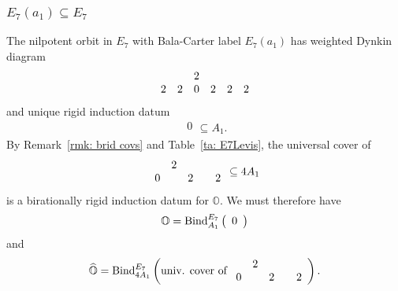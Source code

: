 \documentclass[11pt]{amsart}
\renewcommand{\O}{{\mathbb O}}
\newcommand{\bZ}{{\mathbb Z}}
\newcommand{\BInd}{{{\mbox{\rm Bind}}}}
\newcommand{\hatO}{\widehat{\O}}
\numberwithin{equation}{section}
\begin{document}

	

	\subsubsection{\texorpdfstring{$E_7(a_1)\subseteq E_7$}{E7a1 in E7}}\label{sss: E7a1 in E7}
	
	The nilpotent orbit in $E_7$ with Bala-Carter label $E_7(a_1)$ has weighted Dynkin diagram $$\begin{array}{c c c c c c}
		& & 2 & & & \\
		2 & 2 & 0 & 2 & 2 & 2 \\
	\end{array}$$ and unique rigid induction datum
	$$\begin{array}{c}
		0 \\
	\end{array}\subseteq A_1.$$ By Remark~\ref{rmk: brid covs} and Table~\ref{ta: E7Levis}, the universal cover of $$\begin{array}{c c c c c c}
	& 2 & & & \\
	0  & & 2 & & 2 \\
	\end{array}\subseteq 4A_1$$ is a birationally rigid induction datum for $\O$. We must therefore have
	$$\O = \BInd_{A_1}^{E_7}\left(\begin{array}{c}
		0 \\
	\end{array}\right)$$
	and
	$$\hatO = \BInd_{4A_1}^{E_7}\left( \mbox{univ. cover of }\begin{array}{c c c c c c}
	& 2 & & & \\
	 0 &  & 2 & & 2 \\
	\end{array} \right).$$
	\iffalse	
	
\end{document}
